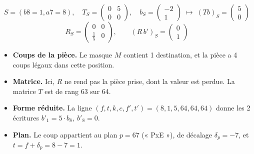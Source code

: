 \[ S = (b8=1, a7=8),\quad T_S = \begin{pmatrix}0 & 5 \\ 0 & 0\end{pmatrix},\quad b_S = \begin{pmatrix}-2 \\ 1\end{pmatrix}\;\longmapsto\; (Tb)_S =\begin{pmatrix}5 \\ 0\end{pmatrix} \]
\[ R_S = \begin{pmatrix}0 & 0 \\ \tfrac{1}{5} & 0\end{pmatrix},\qquad (R\,b')_S = \begin{pmatrix}0 \\ 1\end{pmatrix} \]
\begin{itemize}
\item \textbf{Coups de la pièce.} Le masque $M$ contient 1 destination, et la pièce a 4 coups légaux dans cette position.
\item \textbf{Matrice.} Ici, $R$ ne rend pas la pièce prise, dont la valeur est perdue. La matrice $T$ est de rang 63 sur 64.
\item \textbf{Forme réduite.} La ligne $(f, t, k, c, f', t') = (8, 1, 5, 64, 64, 64)$ donne les 2 écritures $b'_{1} = 5\cdot b_{8},\ b'_{8} = 0$.
\item \textbf{Plan.} Le coup appartient au plan $p = 67$ (« PxE »), de décalage $\delta_p = -7$, et $t = f + \delta_p = 8 -7 = 1$.
\end{itemize}
